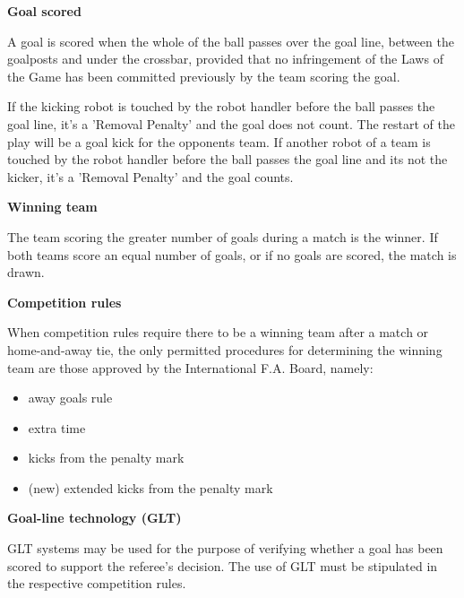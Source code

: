 \clearpage
\sffamily
{\bfseries\color[rgb]{0.4,0.4,0.4}{Law 10 -- The Method of Scoring} }
{}

\bigskip

{\bfseries Goal scored }

\headlinebox

A goal is scored when the whole of the ball passes over the goal line,
between the goalposts and under the crossbar,
provided that no infringement of the Laws of the Game has been committed
previously by the team scoring the goal.

\bigskip

If the kicking robot is touched by the robot handler before the ball passes the goal line,
it's a 'Removal Penalty' and the goal does not count.
The restart of the play will be a goal kick for the opponents team.
If another robot of a team is touched by the robot handler before the ball
passes the goal line and its not the kicker, it's a 'Removal Penalty' and the goal counts.

\bigskip

{\bfseries Winning team}

\headlinebox

The team scoring the greater number of goals during a match is the winner. If both teams score an equal number of goals, or if no goals are scored, the match is drawn. 

\bigskip

{\bfseries Competition rules }

\headlinebox

When competition rules require there to be a winning team after a match or home-and-away tie, the only permitted procedures for determining the winning team are those approved by the International F.A. Board, namely:

\begin{itemize}
\item away goals rule
\item extra time
\item kicks from the penalty mark
\item (new) extended kicks from the penalty mark
\end{itemize}


{\bfseries Goal-line technology (GLT) }

\headlinebox

GLT systems may be used for the purpose of verifying whether a goal has been scored to support the referee{\textquoteright}s decision. The use of GLT must be stipulated in the respective competition rules.
